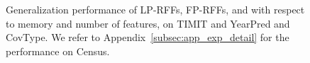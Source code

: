 \begin{figure}
\begin{small}
\begin{tabular}{@{\hskip -0.05in}c@{\hskip -0.1in}c@{\hskip -0.1in}c@{\hskip -0.05in}}
	\end{tabular}
	\end{small}
	\caption{Generalization performance of LP-RFFs, FP-RFFs, and \Nystrom with respect to memory and number of features, on TIMIT and YearPred and CovType. We refer to Appendix~\ref{subsec:app_exp_detail} for the performance on Census.
}
	\label{fig:generalization_col}
\end{figure}

